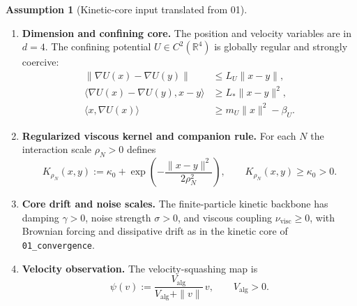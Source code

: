 \documentclass[11pt]{article}
\theoremstyle{definition}
\newtheorem{assumption}[theorem]{Assumption}
\theoremstyle{remark}
\newcommand{\R}{\mathbb R}
\begin{document}
\begin{assumption}[Kinetic-core input translated from 01]
\label{ass:01-core}
\begin{enumerate}[leftmargin=1.5em,label=\textnormal{(\roman*)}]
\item\textbf{Dimension and confining core.}
The position and velocity variables are in $d=4$.
The confining potential \(U\in C^2(\R^4)\) is globally regular and strongly
coercive:
\begin{align*}
\|\nabla U(x)-\nabla U(y)\|&\le L_U\|x-y\|,\\
\langle\nabla U(x)-\nabla U(y),x-y\rangle&\ge L_*\|x-y\|^2,\\
\langle x,\nabla U(x)\rangle&\ge m_U\|x\|^2-\beta_U.
\end{align*}
\item\textbf{Regularized viscous kernel and companion rule.}
For each \(N\) the interaction scale \(\rho_N>0\) defines
\[
K_{\rho_N}(x,y):=\kappa_0+\exp\!\left(-\frac{\|x-y\|^2}{2\rho_N^2}\right),
\qquad
K_{\rho_N}(x,y)\ge\kappa_0>0.
\]
\item\textbf{Core drift and noise scales.}
The finite-particle kinetic backbone has damping \(\gamma>0\), noise strength
\(\sigma>0\), and viscous coupling \(\nu_{\mathrm{visc}}\ge0\), with Brownian forcing and dissipative drift as in the kinetic core of \texttt{01\_convergence}.
\item\textbf{Velocity observation.}
The velocity-squashing map is
\[
\psi(v):=\frac{V_{\mathrm{alg}}}{V_{\mathrm{alg}}+\|v\|}\,v,\qquad V_{\mathrm{alg}}>0.
\]
\end{enumerate}
\end{assumption}
\end{document}
